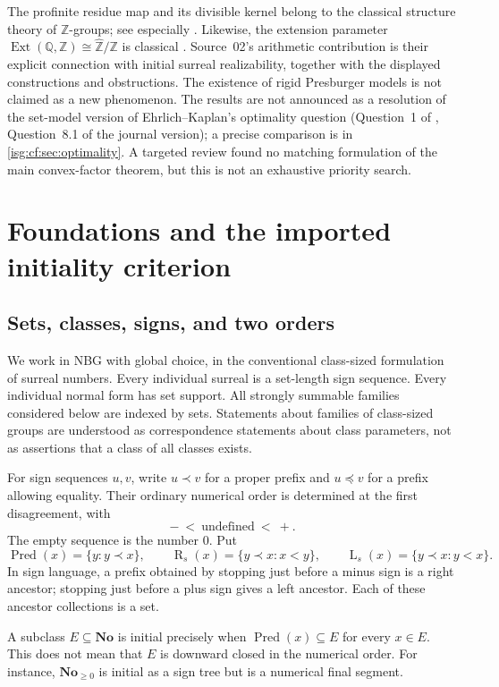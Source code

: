 \documentclass[11pt]{article}
\theoremstyle{definition}
\theoremstyle{remark}
\newcommand{\No}{\ensuremath{\mathbf{No}}}
\newcommand{\Z}{\mathbb{Z}}
\newcommand{\Pred}{\operatorname{Pred}}
\newcommand{\Rs}{\operatorname{R}_{s}}
\newcommand{\Ls}{\operatorname{L}_{s}}
\newcommand{\pr}{\mathrel{\prec}}
\newcommand{\pre}{\mathrel{\preccurlyeq}}
\newcommand{\Q}{\mathbb{Q}}
\newcommand{\Zhat}{\widehat{\Z}}
\newcommand{\Ext}{\operatorname{Ext}}
\begin{document}
The profinite residue map and its divisible kernel belong to the
classical structure theory of $\Z$-groups; see especially
\cite[Sections~2 and~4]{Jerabek}. Likewise, the extension parameter
$\Ext(\Q,\Z)\cong\Zhat/\Z$ is classical \cite[Example~8.27]{Strickland}.
Source~02's arithmetic contribution is their explicit connection with
initial surreal realizability, together with the displayed constructions
and obstructions. The existence of rigid Presburger models is not claimed
as a new phenomenon. The results are not announced as a resolution of the
set-model version of Ehrlich--Kaplan's optimality question (Question~1 of
\cite{EK}, Question~8.1 of the journal version); a precise comparison is
in \cref{isg:cf:sec:optimality}. A targeted review found no matching
formulation of the main convex-factor theorem, but this is not an
exhaustive priority search.

\section{Foundations and the imported initiality criterion}\label{isg:sec:background}

\subsection{Sets, classes, signs, and two orders}
We work in NBG with global choice, in the conventional class-sized
formulation of surreal numbers. Every individual surreal is a
set-length sign sequence. Every individual normal form has set support.
All strongly summable families considered below are indexed by sets.
Statements about families of class-sized groups are understood as
correspondence statements about class parameters, not as assertions that
a class of all classes exists.

For sign sequences $u,v$, write $u\pr v$ for a proper prefix and
$u\pre v$ for a prefix allowing equality. Their ordinary numerical order
is determined at the first disagreement, with
\[
 -\ <\ \text{undefined}\ <\ +.
\]
The empty sequence is the number $0$. Put
\[
 \Pred(x)=\{y:y\pr x\},\qquad
 \Rs(x)=\{y\pr x:x<y\},\qquad
 \Ls(x)=\{y\pr x:y<x\}.
\]
In sign language, a prefix obtained by stopping just before a minus sign
is a right ancestor; stopping just before a plus sign gives a left
ancestor. Each of these ancestor collections is a set.

A subclass $E\subseteq\No$ is initial precisely when
$\Pred(x)\subseteq E$ for every $x\in E$. This does not mean that $E$
is downward closed in the numerical order. For instance, $\No_{\ge0}$
is initial as a sign tree but is a numerical final segment.
\end{document}
